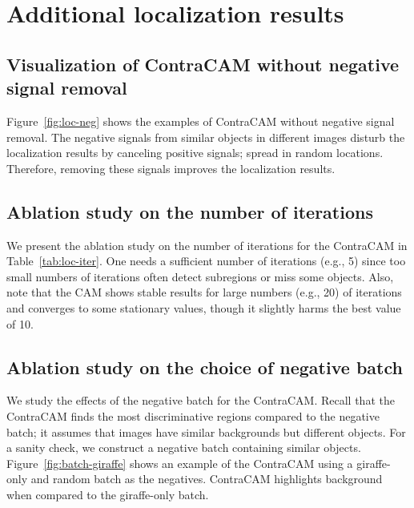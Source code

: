 \section{Additional localization results}
\label{sec:add-loc}


\subsection{Visualization of ContraCAM without negative signal removal}
\label{sec:add-loc-neg}

Figure~\ref{fig:loc-neg} shows the examples of ContraCAM without negative signal removal. The negative signals from similar objects in different images disturb the localization results by canceling positive signals; spread in random locations. Therefore, removing these signals improves the localization results.




\subsection{Ablation study on the number of iterations}
\label{sec:add-loc-iter}

We present the ablation study on the number of iterations for the ContraCAM in Table~\ref{tab:loc-iter}. One needs a sufficient number of iterations (e.g., 5) since too small numbers of iterations often detect subregions or miss some objects. Also, note that the CAM shows stable results for large numbers (e.g., 20) of iterations and converges to some stationary values, though it slightly harms the best value of 10.




\newpage
\subsection{Ablation study on the choice of negative batch}
\label{sec:add-loc-batch}

We study the effects of the negative batch for the ContraCAM. Recall that the ContraCAM finds the most discriminative regions compared to the negative batch; it assumes that images have similar backgrounds but different objects. For a sanity check, we construct a negative batch containing similar objects. Figure~\ref{fig:batch-giraffe} shows an example of the ContraCAM using a giraffe-only and random batch as the negatives. ContraCAM highlights background when compared to the giraffe-only batch.

